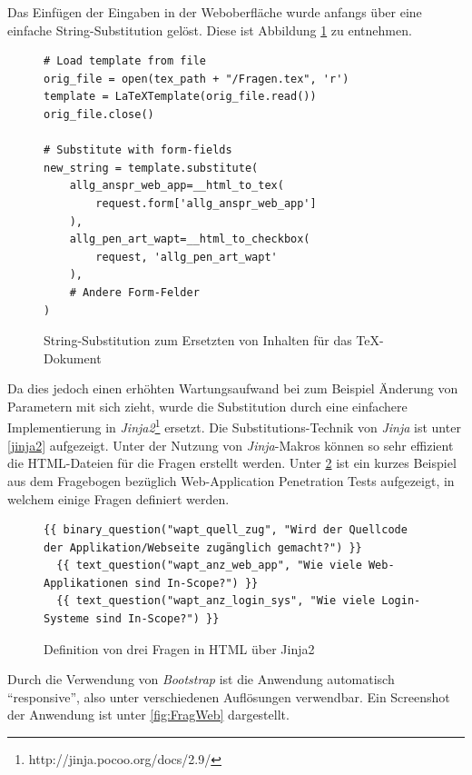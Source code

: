 Das Einfügen der Eingaben in der Weboberfläche wurde anfangs über eine einfache String-Substitution gelöst. Diese ist Abbildung \ref{lst:PenProzVorbereitStringSub} zu entnehmen.
\begin{figure}
\lstset{language=Python}
\begin{lstlisting}
# Load template from file
orig_file = open(tex_path + "/Fragen.tex", 'r')
template = LaTeXTemplate(orig_file.read())
orig_file.close()

# Substitute with form-fields
new_string = template.substitute(
    allg_anspr_web_app=__html_to_tex(
        request.form['allg_anspr_web_app']
    ),
    allg_pen_art_wapt=__html_to_checkbox(
        request, 'allg_pen_art_wapt'
    ),
    # Andere Form-Felder
)
\end{lstlisting}
\caption{String-Substitution zum Ersetzten von Inhalten für das TeX-Dokument}
\label{lst:PenProzVorbereitStringSub}
\end{figure}
Da dies jedoch einen erhöhten Wartungsaufwand bei zum Beispiel Änderung von Parametern mit sich zieht, wurde die Substitution durch eine einfachere Implementierung in \textit{Jinja2}\footnote{http://jinja.pocoo.org/docs/2.9/} ersetzt. Die Substitutions-Technik von \textit{Jinja} ist unter \ref{jinja2} aufgezeigt. Unter der Nutzung von \textit{Jinja}-Makros können so sehr effizient die HTML-Dateien für die Fragen erstellt werden. Unter \ref{lis:PenProzAufwFragHTMLJinja} ist ein kurzes Beispiel aus dem Fragebogen bezüglich Web-Application Penetration Tests aufgezeigt, in welchem einige Fragen definiert werden.

\begin{figure}[htbp]
\begin{lstlisting}
{{ binary_question("wapt_quell_zug", "Wird der Quellcode der Applikation/Webseite zugänglich gemacht?") }}
  {{ text_question("wapt_anz_web_app", "Wie viele Web-Applikationen sind In-Scope?") }}
  {{ text_question("wapt_anz_login_sys", "Wie viele Login-Systeme sind In-Scope?") }}
\end{lstlisting}
\caption{Definition von drei Fragen in HTML über Jinja2}
\label{lis:PenProzAufwFragHTMLJinja}
\end{figure}

Durch die Verwendung von \textit{Bootstrap} ist die Anwendung automatisch "`responsive"', also unter verschiedenen Auflösungen verwendbar. Ein Screenshot der Anwendung ist unter \ref{fig:FragWeb} dargestellt.\\

